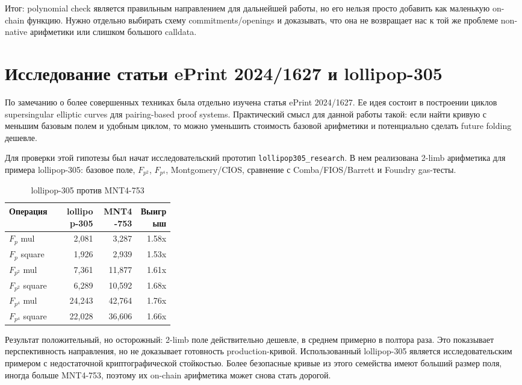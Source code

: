 \documentclass[12pt,a4paper]{article}
\newcommand{\code}[1]{\texttt{#1}}
\begin{document}
Итог: polynomial check является правильным направлением для дальнейшей работы, но его нельзя просто добавить как маленькую on-chain функцию. Нужно отдельно выбирать схему commitments/openings и доказывать, что она не возвращает нас к той же проблеме non-native арифметики или слишком большого calldata.

\section{Исследование статьи ePrint 2024/1627 и lollipop-305}

По замечанию о более совершенных техниках была отдельно изучена статья ePrint 2024/1627. Ее идея состоит в построении циклов supersingular elliptic curves для pairing-based proof systems. Практический смысл для данной работы такой: если найти кривую с меньшим базовым полем и удобным циклом, то можно уменьшить стоимость базовой арифметики и потенциально сделать future folding дешевле.

Для проверки этой гипотезы был начат исследовательский прототип \code{lollipop305\_research}. В нем реализована 2-limb арифметика для примера lollipop-305: базовое поле, \(F_{p^2}\), \(F_{p^4}\), Montgomery/CIOS, сравнение с Comba/FIOS/Barrett и Foundry gas-тесты.

\begin{table}[h!]
\centering
\caption{lollipop-305 против MNT4-753}
\begin{tabular}{p{0.32\linewidth}rrr}
\toprule
Операция & lollipop-305 & MNT4-753 & Выигрыш \\
\midrule
\(F_p\) mul & 2,081 & 3,287 & 1.58x \\
\(F_p\) square & 1,926 & 2,939 & 1.53x \\
\(F_{p^2}\) mul & 7,361 & 11,877 & 1.61x \\
\(F_{p^2}\) square & 6,289 & 10,592 & 1.68x \\
\(F_{p^4}\) mul & 24,243 & 42,764 & 1.76x \\
\(F_{p^4}\) square & 22,028 & 36,606 & 1.66x \\
\bottomrule
\end{tabular}
\end{table}

Результат положительный, но осторожный: 2-limb поле действительно дешевле, в среднем примерно в полтора раза. Это показывает перспективность направления, но не доказывает готовность production-кривой. Использованный lollipop-305 является исследовательским примером с недостаточной криптографической стойкостью. Более безопасные кривые из этого семейства имеют больший размер поля, иногда больше MNT4-753, поэтому их on-chain арифметика может снова стать дорогой.
\end{document}

